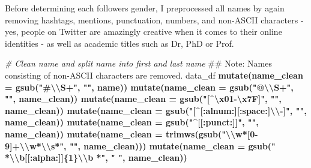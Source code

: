 \documentclass[]{article}
\newenvironment{Shaded}{\begin{snugshade}}{\end{snugshade}}
\newcommand{\KeywordTok}[1]{\textcolor[rgb]{0.13,0.29,0.53}{\textbf{#1}}}
\newcommand{\DataTypeTok}[1]{\textcolor[rgb]{0.13,0.29,0.53}{#1}}
\newcommand{\CharTok}[1]{\textcolor[rgb]{0.31,0.60,0.02}{#1}}
\newcommand{\StringTok}[1]{\textcolor[rgb]{0.31,0.60,0.02}{#1}}
\newcommand{\CommentTok}[1]{\textcolor[rgb]{0.56,0.35,0.01}{\textit{#1}}}
\newcommand{\OperatorTok}[1]{\textcolor[rgb]{0.81,0.36,0.00}{\textbf{#1}}}
\newcommand{\NormalTok}[1]{#1}
\begin{document}
Before determining each followers gender, I preprocessed all names by
again removing hashtags, mentions, punctuation, numbers, and non-ASCII
characters - yes, people on Twitter are amazingly creative when it comes
to their online identities - as well as academic titles such as Dr, PhD
or Prof.

\begin{Shaded}
\begin{Highlighting}[]
\CommentTok{# Clean name and split name into first and last name}
\NormalTok{## Note: Names consisting of non-ASCII characters are removed.}
\NormalTok{data_df }\OperatorTok{%<>%}
\StringTok{  }\KeywordTok{mutate}\NormalTok{(}\DataTypeTok{name_clean =} \KeywordTok{gsub}\NormalTok{(}\StringTok{"#}\CharTok{\textbackslash{}\textbackslash{}}\StringTok{S+"}\NormalTok{, }\StringTok{""}\NormalTok{, name)) }\OperatorTok{%>%}\StringTok{ }
\StringTok{  }\KeywordTok{mutate}\NormalTok{(}\DataTypeTok{name_clean =} \KeywordTok{gsub}\NormalTok{(}\StringTok{"@}\CharTok{\textbackslash{}\textbackslash{}}\StringTok{S+"}\NormalTok{, }\StringTok{""}\NormalTok{, name_clean)) }\OperatorTok{%>%}\StringTok{ }
\StringTok{  }\KeywordTok{mutate}\NormalTok{(}\DataTypeTok{name_clean =} \KeywordTok{gsub}\NormalTok{(}\StringTok{"[^}\CharTok{\textbackslash{}x01}\StringTok{-}\CharTok{\textbackslash{}x7F}\StringTok{]"}\NormalTok{, }\StringTok{""}\NormalTok{, name_clean)) }\OperatorTok{%>%}\StringTok{ }\CommentTok{# remove non-ASCII characters}
\StringTok{  }\KeywordTok{mutate}\NormalTok{(}\DataTypeTok{name_clean =} \KeywordTok{gsub}\NormalTok{(}\StringTok{"[^[:alnum:][:space:]}\CharTok{\textbackslash{}\textbackslash{}}\StringTok{-]"}\NormalTok{, }\StringTok{""}\NormalTok{, name_clean)) }\OperatorTok{%>%}\StringTok{ }
\StringTok{  }\KeywordTok{mutate}\NormalTok{(}\DataTypeTok{name_clean =} \KeywordTok{gsub}\NormalTok{(}\StringTok{"^[[:punct:]]"}\NormalTok{, }\StringTok{""}\NormalTok{, name_clean)) }\OperatorTok{%>%}\StringTok{ }
\StringTok{  }\KeywordTok{mutate}\NormalTok{(}\DataTypeTok{name_clean =} \KeywordTok{trimws}\NormalTok{(}\KeywordTok{gsub}\NormalTok{(}\StringTok{"}\CharTok{\textbackslash{}\textbackslash{}}\StringTok{w*[0-9]+}\CharTok{\textbackslash{}\textbackslash{}}\StringTok{w*}\CharTok{\textbackslash{}\textbackslash{}}\StringTok{s*"}\NormalTok{, }\StringTok{""}\NormalTok{, name_clean))) }\OperatorTok{%>%}
\StringTok{  }\KeywordTok{mutate}\NormalTok{(}\DataTypeTok{name_clean =} \KeywordTok{gsub}\NormalTok{(}\StringTok{" *}\CharTok{\textbackslash{}\textbackslash{}}\StringTok{b[[:alpha:]]\{1\}}\CharTok{\textbackslash{}\textbackslash{}}\StringTok{b *"}\NormalTok{, }\StringTok{" "}\NormalTok{, name_clean)) }\OperatorTok{%>%}\StringTok{ }
}}}}}}}}
\end{Highlighting}
\end{Shaded}
\end{document}
